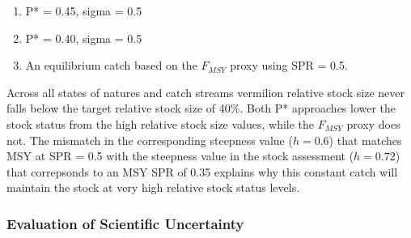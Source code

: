 \documentclass[11pt,
  english,
  a4paper,
]{article}
\begin{document}
\leavevmode\tagmcend\tagstructend\par


\begin{enumerate}
\def\labelenumi{\arabic{enumi}.}
\item

  P* = 0.45, sigma = 0.5

  \tagmcend\tagstructend\tagstructend
\item

  P* = 0.40, sigma = 0.5

  \tagmcend\tagstructend\tagstructend
\item

  An equilibrium catch based on the {\(F_{MSY}\)\leavevmode\tagmcend\tagstructend} proxy using SPR = 0.5.

  \tagmcend\tagstructend\tagstructend
\end{enumerate}

\tagstructend


Across all states of natures and catch streams vermilion relative stock size never falls below the target relative stock size of 40\%. Both P* approaches lower the stock status from the high relative stock size values, while the {\(F_{MSY}\)\leavevmode\tagmcend\tagstructend} proxy does not. The mismatch in the corresponding steepness value ({\(h=0.6\)\leavevmode\tagmcend\tagstructend}) that matches MSY at SPR = 0.5 with the steepness value in the stock assessment ({\(h=0.72\)\leavevmode\tagmcend\tagstructend}) that correpsonds to an MSY SPR of 0.35 explains why this constant catch will maintain the stock at very high relative stock status levels.

\leavevmode\tagmcend\tagstructend\par


\hypertarget{evaluation-of-scientific-uncertainty}{%
\subsubsection{Evaluation of Scientific Uncertainty}\label{evaluation-of-scientific-uncertainty}}
\end{document}
